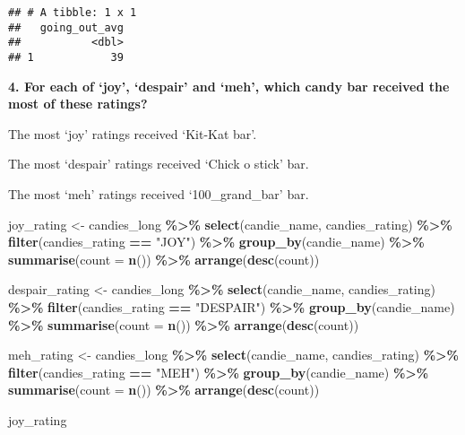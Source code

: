 \documentclass[
]{article}
\newenvironment{Shaded}{\begin{snugshade}}{\end{snugshade}}
\newcommand{\AttributeTok}[1]{\textcolor[rgb]{0.13,0.29,0.53}{#1}}
\newcommand{\FunctionTok}[1]{\textcolor[rgb]{0.13,0.29,0.53}{\textbf{#1}}}
\newcommand{\NormalTok}[1]{#1}
\newcommand{\OtherTok}[1]{\textcolor[rgb]{0.56,0.35,0.01}{#1}}
\newcommand{\SpecialCharTok}[1]{\textcolor[rgb]{0.81,0.36,0.00}{\textbf{#1}}}
\newcommand{\StringTok}[1]{\textcolor[rgb]{0.31,0.60,0.02}{#1}}
\begin{document}
\begin{verbatim}
## # A tibble: 1 x 1
##   going_out_avg
##           <dbl>
## 1            39
\end{verbatim}

\textbf{4. For each of `joy', `despair' and `meh', which candy bar
received the most of these ratings?}

The most `joy' ratings received `Kit-Kat bar'.

The most `despair' ratings received `Chick o stick' bar.

The most `meh' ratings received `100\_grand\_bar' bar.

\begin{Shaded}
\begin{Highlighting}[]
\NormalTok{joy\_rating }\OtherTok{\textless{}{-}}\NormalTok{ candies\_long }\SpecialCharTok{\%\textgreater{}\%} 
  \FunctionTok{select}\NormalTok{(candie\_name, candies\_rating) }\SpecialCharTok{\%\textgreater{}\%} 
  \FunctionTok{filter}\NormalTok{(candies\_rating }\SpecialCharTok{==} \StringTok{"JOY"}\NormalTok{) }\SpecialCharTok{\%\textgreater{}\%} 
  \FunctionTok{group\_by}\NormalTok{(candie\_name) }\SpecialCharTok{\%\textgreater{}\%} 
  \FunctionTok{summarise}\NormalTok{(}\AttributeTok{count =} \FunctionTok{n}\NormalTok{()) }\SpecialCharTok{\%\textgreater{}\%} 
  \FunctionTok{arrange}\NormalTok{(}\FunctionTok{desc}\NormalTok{(count))}

\NormalTok{despair\_rating }\OtherTok{\textless{}{-}}\NormalTok{ candies\_long }\SpecialCharTok{\%\textgreater{}\%} 
  \FunctionTok{select}\NormalTok{(candie\_name, candies\_rating) }\SpecialCharTok{\%\textgreater{}\%} 
  \FunctionTok{filter}\NormalTok{(candies\_rating }\SpecialCharTok{==} \StringTok{"DESPAIR"}\NormalTok{) }\SpecialCharTok{\%\textgreater{}\%} 
  \FunctionTok{group\_by}\NormalTok{(candie\_name) }\SpecialCharTok{\%\textgreater{}\%} 
  \FunctionTok{summarise}\NormalTok{(}\AttributeTok{count =} \FunctionTok{n}\NormalTok{()) }\SpecialCharTok{\%\textgreater{}\%} 
  \FunctionTok{arrange}\NormalTok{(}\FunctionTok{desc}\NormalTok{(count))}

\NormalTok{meh\_rating }\OtherTok{\textless{}{-}}\NormalTok{ candies\_long }\SpecialCharTok{\%\textgreater{}\%} 
  \FunctionTok{select}\NormalTok{(candie\_name, candies\_rating) }\SpecialCharTok{\%\textgreater{}\%} 
  \FunctionTok{filter}\NormalTok{(candies\_rating }\SpecialCharTok{==} \StringTok{"MEH"}\NormalTok{) }\SpecialCharTok{\%\textgreater{}\%} 
  \FunctionTok{group\_by}\NormalTok{(candie\_name) }\SpecialCharTok{\%\textgreater{}\%} 
  \FunctionTok{summarise}\NormalTok{(}\AttributeTok{count =} \FunctionTok{n}\NormalTok{()) }\SpecialCharTok{\%\textgreater{}\%} 
  \FunctionTok{arrange}\NormalTok{(}\FunctionTok{desc}\NormalTok{(count))}
  
\NormalTok{joy\_rating}
\end{Highlighting}
\end{Shaded}
\end{document}
